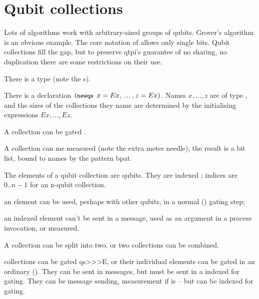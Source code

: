
\chapter{Qubit collections}

Lots of algorithms work with arbitrary-sized groups of qubits. Grover's algorithm is an obvious example. The core notation of  allows only single bits. Qubit collections fill the gap, but to preserve qtpi's guarantee of no sharing, no duplication there are some restrictions on their use.

\begin{itemize*}
\item There is a type  (note the s).
\item There is a declaration $\texttt{\small{}(newqs } x=Ex, \;...\; ,z=Ex )$. Names $x, ... ,z$ are of type , and the sizes of the collections they name are determined by the initialising expressions $Ex, ..., Ez$.
\item A collection can be gated .
\item A collection can me measured  (note the extra meter needle); the result is a bit list, bound to names by the pattern bpat.
\item The elements of a qubit collection are qubits. They are indexed ; indices are $0..n-1$ for an n-qubit collection. 
\begin{itemize*}
\item an element can be used, perhaps with other qubits, in a normal (\verbtt{>>}) gating step;
\item an indexed element can't be sent in a message, used as an argument in a process invocation, or measured.
\end{itemize*}
\item A collection can be split into two, or two collections can be combined.
\item collections can be gated qs>>>E, or their individual elements can be gated in an ordinary (). They can be sent in messages, but must be sent in a indexed for gating. They can be  message sending, measurement if  is  -- but can be indexed for gating. 
\end{itemize*}

